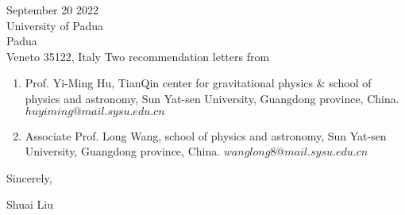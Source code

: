 \documentclass[11pt,a4paper,sans]{letter} %
\begin{document}
\begin{letter}{September 20 2022 \\
University of Padua\\
Padua\\ 
Veneto 35122, Italy}
Two recommendation letters from \begin{enumerate}[itemsep=-0pt,leftmargin=1.2em,topsep=-10pt]
\item Prof. Yi-Ming Hu, TianQin center for gravitational physics \& school of physics and astronomy, Sun Yat-sen University,
Guangdong province, China. $huyiming@mail.sysu.edu.cn$
\item Associate Prof. Long Wang, school of physics and astronomy, Sun Yat-sen University, Guangdong province, China.
$wanglong8@mail.sysu.edu.cn$\\
\end{enumerate}


         
Sincerely,

Shuai Liu




\end{letter}
\end{document}
